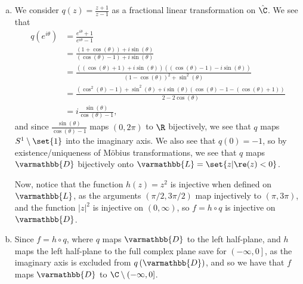 \documentclass[11pt]{mypackage}
\renewcommand*{\mathbb}[1]{\varmathbb{#1}}
\begin{document}
\begin{solution}\hfill
  \begin{enumerate}[(a)]
    \item We consider $q(z) = \frac{z+1}{z-1}$ as a fractional linear transformation on $\hat{\C}$. We see that
      \begin{align*}
        q\left( e^{i\theta} \right) &= \frac{e^{i\theta} + 1}{e^{i\theta} - 1}\\
                                    &= \frac{\left( 1+\cos\left( \theta \right) \right) + i\sin\left( \theta \right)}{\left( \cos\left( \theta \right) - 1 \right) + i\sin\left( \theta \right)}\\
                                    &= \frac{\left( \left( \cos\left( \theta \right) +1 \right) + i\sin\left( \theta \right) \right)\left( \left( \cos\left( \theta \right)-1 \right) - i\sin\left( \theta \right)  \right)}{\left( 1-\cos\left( \theta \right) \right)^2 + \sin^2\left( \theta \right)}\\
                                    &= \frac{\left( \cos^2\left( \theta \right) - 1 \right) + \sin^2\left( \theta \right) + i\sin\left( \theta \right)\left( \cos\left( \theta \right) - 1 - \left( \cos\left( \theta \right) + 1 \right) \right)}{2-2\cos\left( \theta \right)}\\
                                    &= i\frac{\sin\left( \theta \right)}{\cos\left( \theta \right)-1},
      \end{align*}
      and since $\frac{\sin\left( \theta \right)}{\cos\left( \theta \right)-1}$ maps $(0,2\pi) $ to $ \R$ bijectively, we see that $q$ maps $S^{1}\setminus \set{1}$ into the imaginary axis. We also see that $q(0) = -1$, so by existence/uniqueness of Möbius transformations, we see that $q$ maps $\mathbb{D}$ bijectively onto $\mathbb{L} = \set{z | \re(z) < 0}$.\newline

      Now, notice that the function $h(z) = z^2$ is injective when defined on $\mathbb{L}$, as the arguments $\left( \pi/2,3\pi/2 \right)$ map injectively to $\left( \pi,3\pi \right)$, and the function $\left\vert z \right\vert^2$ is injective on $(0,\infty)$, so $f = h\circ q$ is injective on $ \mathbb{D} $.
    \item Since $f = h\circ q$, where $q$ maps $ \mathbb{D} $ to the left half-plane, and $h$ maps the left half-plane to the full complex plane save for $\left( -\infty,0 \right]$, as the imaginary axis is excluded from $q\left( \mathbb{D} \right)$, and so we have that $f$ maps $\mathbb{D}$ to $\C\setminus (-\infty,0]$.
  \end{enumerate}
\end{solution}
\end{document}
